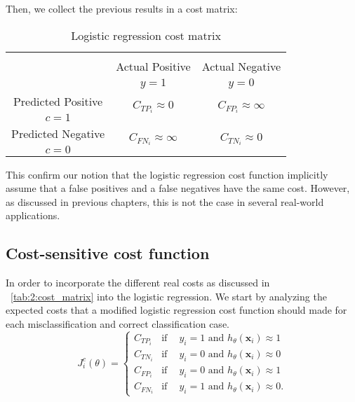 \noindent Then, we collect the previous results in a cost matrix:
  \begin{table}[htbp]
    \centering
    \footnotesize
    \begin{tabular}{c|c|c}
      \multicolumn{3}{c}{}\\
      \multicolumn{1}{c|}{}  & Actual Positive& Actual Negative \\
      \multicolumn{1}{c|}{} & $y=1$& $y=0$ \\
      \hline
      Predicted Positive    & \multirow{ 2}{*}{$C_{{TP}_i}\approx 0$} & 
      \multirow{2}{*}{$C_{{FP}_i}\approx \infty$} \\
      $c=1$ & &\\
      \hline
      Predicted Negative    & \multirow{ 2}{*}{$C_{{FN}_i}\approx \infty$} & \multirow{ 
      2}{*}{$C_{{TN}_i}\approx 0$} \\
      $c=0$ & &\\
    \end{tabular}
    \caption{Logistic regression cost matrix}
    \label{tab:2:1}
  \end{table} 
  
This confirm our notion that the logistic regression cost function implicitly assume that 
a false positives and a false negatives have the same cost. However, as discussed in previous 
chapters, this is not the case in several real-world applications.

  
\subsection{Cost-sensitive cost function}
\label{sec:6:cscostfunction}

In order to incorporate the different real costs as discussed in 
\tablename{~\ref{tab:2:cost_matrix}} into the logistic regression. We start by analyzing the 
expected costs that a modified logistic regression cost function should made for each 
misclassification and correct classification case.
\begin{equation*}
  J^c_i(\theta) = 
  \begin{cases}
    C_{TP_i}    & \text{if} \phantom{-}  y_i = 1 \text{ and } h_\theta(\mathbf{x}_i) \approx 1  \\
    C_{TN_i}    & \text{if} \phantom{-}  y_i = 0 \text{ and } h_\theta(\mathbf{x}_i) \approx 0  \\
    C_{FP_i}    & \text{if} \phantom{-}  y_i = 0 \text{ and } h_\theta(\mathbf{x}_i) \approx 1  \\
    C_{FN_i}    & \text{if} \phantom{-}  y_i = 1 \text{ and } h_\theta(\mathbf{x}_i) \approx 0 .
  \end{cases}
\end{equation*}

